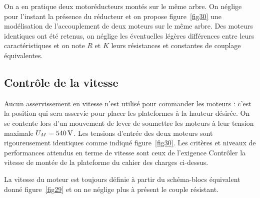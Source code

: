 

On a en pratique deux motoréducteurs montés sur le même arbre. On néglige pour l'instant la présence du réducteur et on propose figure~\ref{fig30} une modélisation de l'accouplement de deux moteurs sur le même arbre. Des moteurs identiques ont été retenus, on néglige les éventuelles légères différences entre leurs caractéristiques et on note $R$ et $K$ leurs résistances et constantes de couplage équivalentes.




\subsection{Contrôle de la vitesse}

Aucun asservissement en vitesse n'est utilisé pour commander les moteurs : c'est la position qui sera asservie pour placer les plateformes à la hauteur désirée. On se contente lors d'un mouvement de lever de soumettre les moteurs à leur tension maximale $U_M=540\,\mathrm{V}$. Les tensions d'entrée des deux moteurs sont rigoureusement identiques comme indiqué figure~\ref{fig30}. Les critères et niveaux de performances attendus en terme de vitesse sont ceux de l'exigence \og Contrôler la vitesse de montée de la plateforme \fg{} du cahier des charges ci-dessus.

La vitesse du moteur est toujours définie à partir du schéma-blocs équivalent donné figure~\ref{fig29} et on ne néglige plus à présent le couple résistant.


